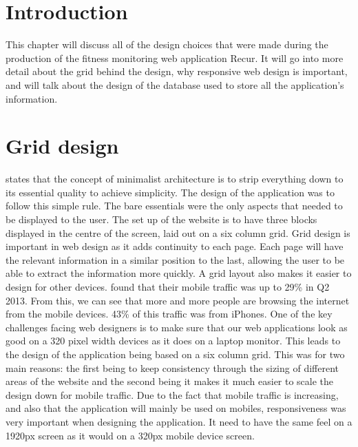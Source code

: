 \section{Introduction}
This chapter will discuss all of the design choices that were made during the production of the fitness monitoring web application Recur. It will go into more detail about the grid behind the design, why responsive web design is important, and will talk about the design of the database used to store all the application's information. \\

\section{Grid design}
\citet{bertoni:2002} states that the concept of minimalist architecture is to strip everything down to its essential quality to achieve simplicity. The design of the application was to follow this simple rule. The bare essentials were the only aspects that needed to be displayed to the user. The set up of the website is to have three blocks displayed in the centre of the screen, laid out on a six column grid. Grid design is important in web design as it adds continuity to each page. Each page will have the relevant information in a similar position to the last, allowing the user to be able to extract the information more quickly. A grid layout also makes it easier to design for other devices. \citet{walkers:2013} found that their mobile traffic was up to 29\% in Q2 2013. From this, we can see that more and more people are browsing the internet from the mobile devices. 43\% of this traffic was from iPhones. One of the key challenges facing web designers is to make sure that our web applications look as good on a 320 pixel width devices as it does on a laptop monitor. This leads to the design of the application being based on a six column grid. This was for two main reasons: the first being to keep consistency through the sizing of different areas of the website and the second being it makes it much easier to scale the design down for mobile traffic. Due to the fact that mobile traffic is increasing, and also that the application will mainly be used on mobiles, responsiveness was very important when designing the application. It need to have the same feel on a 1920px screen as it would on a 320px mobile device screen.\\

